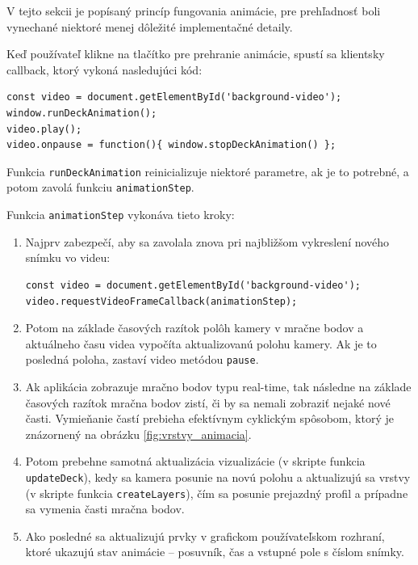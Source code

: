V tejto sekcii je popísaný princíp fungovania animácie, pre prehľadnosť boli vynechané niektoré menej dôležité implementačné detaily.

Keď používateľ klikne na tlačítko pre prehranie animácie, spustí sa klientsky callback, ktorý vykoná nasledujúci kód:

\begin{lstlisting}
const video = document.getElementById('background-video');
window.runDeckAnimation();
video.play();
video.onpause = function(){ window.stopDeckAnimation() };
\end{lstlisting}

Funkcia \texttt{runDeckAnimation} reinicializuje niektoré parametre, ak je to potrebné, a potom zavolá funkciu \texttt{animationStep}.

Funkcia \texttt{animationStep} vykonáva tieto kroky:

\begin{enumerate}
    \item Najprv zabezpečí, aby sa zavolala znova pri najbližšom vykreslení nového snímku vo videu:
    \begin{lstlisting}
const video = document.getElementById('background-video');
video.requestVideoFrameCallback(animationStep);
    \end{lstlisting}

    \item Potom na základe časových razítok polôh kamery v mračne bodov a aktuálneho času videa vypočíta aktualizovanú polohu kamery. Ak je to posledná poloha, zastaví video metódou \texttt{pause}.

    \item Ak aplikácia zobrazuje mračno bodov typu real-time, tak následne na základe časových razítok mračna bodov zistí, či by sa nemali zobraziť nejaké nové časti. Vymieňanie častí prebieha efektívnym cyklickým spôsobom, ktorý je znázornený na obrázku \ref{fig:vrstvy_animacia}.

    \item Potom prebehne samotná aktualizácia vizualizácie (v skripte funkcia \texttt{updateDeck}), kedy sa kamera posunie na novú polohu a aktualizujú sa vrstvy (v skripte funkcia \texttt{createLayers}), čím sa posunie prejazdný profil a prípadne sa vymenia časti mračna bodov.

    \item Ako posledné sa aktualizujú prvky v grafickom používateľskom rozhraní, ktoré ukazujú stav animácie -- posuvník, čas a vstupné pole s číslom snímky.
\end{enumerate}

